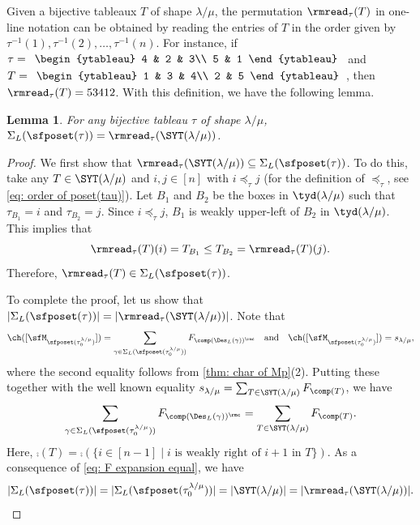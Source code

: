 \documentclass[12pt, reqno]{amsart}
\newtheorem{lemma}[theorem]{Lemma}
\theoremstyle{definition}
\numberwithin{equation}{section} \numberwithin{figure}{section}
\numberwithin{table}{section}
\begin{document}
Given a bijective tableaux $T$ of shape $\lambda / \mu$,  the permutation $\rmread_{\tau}(T)$ in one-line notation can be obtained by reading the entries of $T$ in the order given by $\tau^{-1}(1),  \tau^{-1}(2), \ldots, \tau^{-1}(n)$. For instance, if $\tau = \begin{array}{l}\begin{ytableau}
4  & 2 &  3\\
5  &  1
\end{ytableau}
\end{array}
$ and $T = \begin{array}{l}\begin{ytableau}
1  & 3 &  4\\
2  & 5
\end{ytableau}\end{array}$, then
$\rmread_{\tau}(T) = 53412$.
With this definition, we have the following lemma.


\begin{lemma}\label{lem: identification of P and S}
For any bijective tableau $\tau$ of shape $\lambda / \mu$, 
$\Sigma_L(\sfposet(\tau)) = \rmread_\tau(\SYT(\lambda/\mu))$.
\end{lemma}

\begin{proof}
We first show that $\rmread_\tau(\SYT(\lambda/\mu)) \subseteq \Sigma_L(\sfposet(\tau))$.
To do this, take any $T \in \SYT(\lambda/\mu)$ and $i,j \in [n]$ with $i \preceq_\tau j$ (for the definition of $\preceq_\tau$, see \cref{eq: order of poset(tau)}).
Let $B_1$ and $B_2$ be the boxes in $\tyd(\lambda/\mu)$ such that $\tau_{B_1} = i$ and $\tau_{B_2} = j$.
Since $i \preceq_\tau j$, 
$B_1$ is weakly upper-left of $B_2$ in $\tyd(\lambda/\mu)$.
This implies that 
$$
\rmread_\tau(T)(i) = T_{B_1} \leq T_{B_2} = \rmread_\tau(T)(j).
$$
Therefore, $\rmread_\tau(T) \in \Sigma_L(\sfposet(\tau))$.


To complete the proof, let us show that $|\Sigma_L(\sfposet(\tau))| = |\rmread_\tau(\SYT(\lambda/\mu))|$.
Note that 
\begin{align*}
\ch([\sfM_{\sfposet(\tau^{\lambda/\mu}_0)}]) = \sum_{\gamma \in \Sigma_L(\sfposet(\tau^{\lambda/\mu}_0))} F_{\comp(\Des_L(\gamma))^\rmc}
\quad \text{and} \quad
\ch([\sfM_{\sfposet(\tau^{\lambda/\mu}_0)}]) =  s_{\lambda/\mu},
\end{align*}
where the second equality follows from 
\cref{thm: char of Mp}(2).
Putting these together with the well known equality $s_{\lambda / \mu} = \sum_{T \in \SYT(\lambda / \mu)} F_{\comp(T)}$, we have
\begin{align}\label{eq: F expansion equal}
\sum_{\gamma \in \Sigma_L(\sfposet(\tau^{\lambda/\mu}_0))} F_{\comp(\Des_L(\gamma))^\rmc} 
= \sum_{T \in \SYT(\lambda/\mu)} F_{\comp(T)}.
\end{align}
Here, $\comp(T) = \comp(\{i \in [n-1] \mid \text{$i$ is weakly right of $i+1$ in $T$}\})$.
As a consequence of \cref{eq: F expansion equal}, we have
\[
|\Sigma_L(\sfposet(\tau))| = |\Sigma_L(\sfposet(\tau^{\lambda/\mu}_0))| 
= |\SYT(\lambda/\mu)| = |\rmread_\tau(\SYT(\lambda/\mu))|.
\qedhere
\]
\end{proof}
\end{document}
